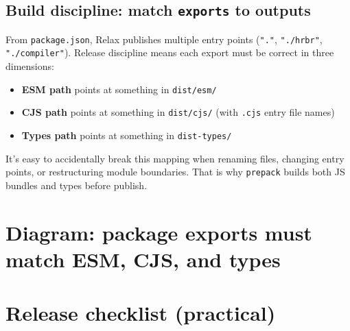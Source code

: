 \subsection{Build discipline: match \texttt{exports} to outputs}

From \texttt{package.json}, Relax publishes multiple entry points (\texttt{"."}, \texttt{"./hrbr"}, \texttt{"./compiler"}).
Release discipline means each export must be correct in three dimensions:

\begin{itemize}
\item \textbf{ESM path} points at something in \texttt{dist/esm/}
\item \textbf{CJS path} points at something in \texttt{dist/cjs/} (with \texttt{.cjs} entry file names)
\item \textbf{Types path} points at something in \texttt{dist-types/}
\end{itemize}

It's easy to accidentally break this mapping when renaming files, changing entry points, or restructuring module boundaries.
That is why \texttt{prepack} builds both JS bundles and types before publish.

\section*{Diagram: package exports must match ESM, CJS, and types}
\begin{center}
\end{center}

\section{Release checklist (practical)}

